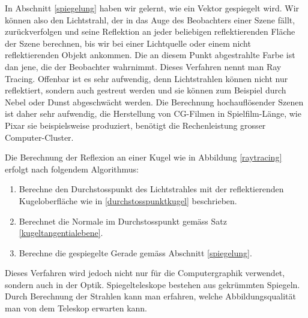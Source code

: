 In Abschnitt \ref{spiegelung} haben wir gelernt, wie ein Vektor
gespiegelt wird.
Wir können also den Lichtstrahl, der in das Auge
des Beobachters einer Szene fällt, zurückverfolgen und seine Reflektion
an jeder beliebigen reflektierenden Fläche der Szene berechnen, bis wir bei
einer Lichtquelle oder einem nicht reflektierenden Objekt ankommen.
Die an diesem Punkt abgestrahlte Farbe ist dan jene, die der Beobachter
wahrnimmt.
Dieses Verfahren nennt man Ray Tracing.
Offenbar ist es sehr
aufwendig, denn Lichtstrahlen können nicht nur reflektiert, sondern auch
gestreut werden und sie können zum Beispiel durch Nebel oder Dunst abgeschwächt
werden.
Die Berechnung hochauflösender Szenen ist daher sehr aufwendig,
die Herstellung von CG-Filmen in Spielfilm-Länge, wie Pixar sie beispielsweise
produziert, benötigt die Rechenleistung grosser Computer-Cluster.

Die Berechnung der Reflexion an einer Kugel wie in Abbildung \ref{raytracing}
erfolgt nach folgendem Algorithmus:
\begin{enumerate}
\item Berechne den Durchstosspunkt des Lichtstrahles mit der reflektierenden
Kugeloberfläche wie in \ref{durchstosspunktkugel} beschrieben.
\item Berechnet die Normale im Durchstosspunkt gemäss Satz \ref{kugeltangentialebene}.
\item Berechne die gespiegelte Gerade gemäss Abschnitt \ref{spiegelung}.
\end{enumerate}
Dieses Verfahren wird jedoch nicht nur für die Computergraphik verwendet,
sondern auch in der Optik.
Spiegelteleskope bestehen aus gekrümmten Spiegeln.
Durch Berechnung der Strahlen kann man erfahren, welche Abbildungsqualität
man von dem Teleskop erwarten kann.

